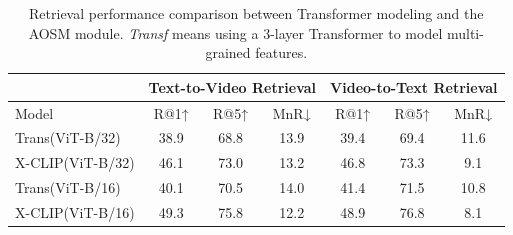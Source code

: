 \documentclass[sigconf]{acmart}
\begin{document}
\begin{table}[]
\caption{Retrieval performance comparison between Transformer modeling and the AOSM module. \emph{Transf} means using a 3-layer Transformer to model multi-grained features.}
\begin{tabular}{l|ccc|ccc} 
\hline
                    & \multicolumn{3}{c}{Text-to-Video Retrieval} & \multicolumn{3}{c}{Video-to-Text Retrieval}               \\ \hline
Model               & R@1↑          & R@5↑                 & MnR↓          & R@1↑          & R@5↑                   & MnR↓    \\ \hline
Trans(ViT-B/32)     & 38.9         & 68.8        & 13.9           & 39.4                & 69.4                & 11.6          \\
X-CLIP(ViT-B/32) & 46.1         & 73.0        & 13.2           & 46.8                & 73.3                & 9.1           \\ \hline
Trans(ViT-B/16)     & 40.1         & 70.5        & 14.0           & 41.4                & 71.5                & 10.8          \\
X-CLIP(ViT-B/16) & 49.3         & 75.8        & 12.2           & 48.9                & 76.8                & 8.1   \\ \hline       
\end{tabular}
\label{tab:Transf}
\end{table}
\end{document}
